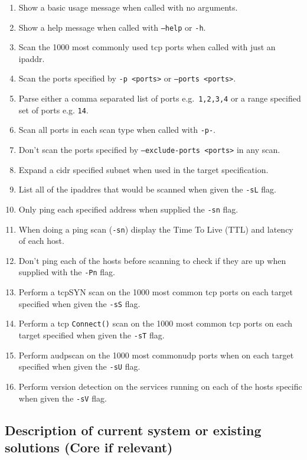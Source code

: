 \documentclass[titlepage]{article}
\let\Oldsubsection\subsection{}
\renewcommand{\subsection}{\FloatBarrier\Oldsubsection}
\begin{document}
\begin{enumerate}
\item{Show a basic usage message when called with no arguments.}
\item{Show a help message when called with \texttt{--help} or \texttt{-h}.}
\item{Scan the 1000 most commonly used \gls{tcp} \glspl{port} when called with just an \gls{ipaddr}.}
\item{Scan the \glspl{port} specified by \texttt{-p <ports>} or \texttt{--ports <ports>}.}
\item{Parse either a comma separated list of \glspl{port} e.g.\ \texttt{1,2,3,4} or a range specified set of \glspl{port} e.g.
  \texttt{1{\textendash}4}}.
\item{Scan all \glspl{port} in each scan type when called with \texttt{-p-}.}
\item{Don't scan the \glspl{port} specified by \texttt{--exclude-ports <ports>} in any scan.}
\item{Expand a \gls{cidr} specified \gls{subnet} when used in the target specification.}
\item{List all of the \gls{ipaddr}es that would be scanned when given the \texttt{-sL} flag.}
\item{Only ping each specified address when supplied the \texttt{-sn} flag.}
\item{When doing a ping scan (\texttt{-sn}) display the Time To Live (TTL) and latency of each host.}
\item{Don't ping each of the hosts before scanning to check if they are up when supplied with the \texttt{-Pn} flag.}
\item{Perform a \gls{tcp}SYN scan on the 1000 most common \gls{tcp} \glspl{port} on each target specified when given the \texttt{-sS} flag.}
\item{Perform a \gls{tcp} \verb|Connect()| scan on the 1000 most common \gls{tcp} \glspl{port} on each target specified when given the \texttt{-sT} flag.}
\item{Perform a\gls{udp}scan on the 1000 most common\gls{udp} \glspl{port} when on each target specified when given the \texttt{-sU} flag.}
\item{Perform version detection on the services running on each of the hosts specific when given the \texttt{-sV} flag.}
\end{enumerate}

\subsection{Description of current system or existing solutions (Core if relevant)}
\end{document}
